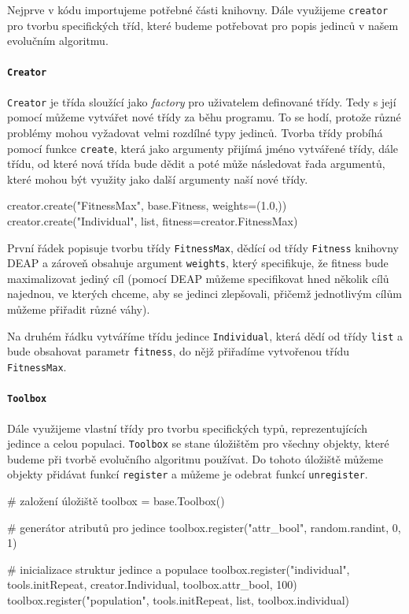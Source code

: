 Nejprve v kódu importujeme potřebné části knihovny. Dále využijeme
\texttt{creator} pro tvorbu specifických tříd, které budeme potřebovat pro
popis jedinců v našem evolučním algoritmu.

\paragraph{\texttt{Creator}} 
\texttt{Creator} je třída sloužící jako \emph{factory} pro uživatelem
definované třídy. Tedy s její pomocí můžeme vytvářet nové třídy za běhu
programu. To se hodí, protože různé problémy mohou vyžadovat velmi rozdílné
typy jedinců. Tvorba třídy probíhá pomocí funkce \texttt{create}, která jako
argumenty přijímá jméno vytvářené třídy, dále třídu, od které nová třída bude
dědit a poté může následovat řada argumentů, které mohou být využity jako další
argumenty naší nové třídy.

\begin{code}
creator.create("FitnessMax", base.Fitness, weights=(1.0,))
creator.create("Individual", list, fitness=creator.FitnessMax)
\end{code}

První řádek popisuje tvorbu třídy \texttt{FitnessMax}, dědící od třídy
\texttt{Fitness} knihovny DEAP a zároveň obsahuje argument \texttt{weights},
který specifikuje, že fitness bude maximalizovat jediný cíl (pomocí DEAP můžeme
specifikovat hned několik cílů najednou, ve kterých chceme, aby se jedinci
zlepšovali, přičemž jednotlivým cílům můžeme přiřadit různé váhy).

Na druhém řádku vytváříme třídu jedince \texttt{Individual}, která dědí od
třídy \texttt{list} a bude obsahovat parametr \texttt{fitness}, do nějž
přiřadíme vytvořenou třídu \texttt{FitnessMax}.

\paragraph{\texttt{Toolbox}}
Dále využijeme vlastní třídy pro tvorbu specifických typů, reprezentujících
jedince a celou populaci. \texttt{Toolbox} se stane úložištěm pro všechny
objekty, které budeme při tvorbě evolučního algoritmu používat. Do tohoto
úložiště můžeme objekty přidávat funkcí \texttt{register} a můžeme je odebrat
funkcí \texttt{unregister}.

\pagebreak
\begin{code}
# založení úložiště 
toolbox = base.Toolbox()

# generátor atributů pro jedince
toolbox.register("attr_bool", random.randint, 0, 1)

# inicializace struktur jedince a populace
toolbox.register("individual", 
                 tools.initRepeat, 
                 creator.Individual, 
                 toolbox.attr_bool, 
                 100)
toolbox.register("population", 
                 tools.initRepeat, 
                 list, 
                 toolbox.individual)
\end{code}

